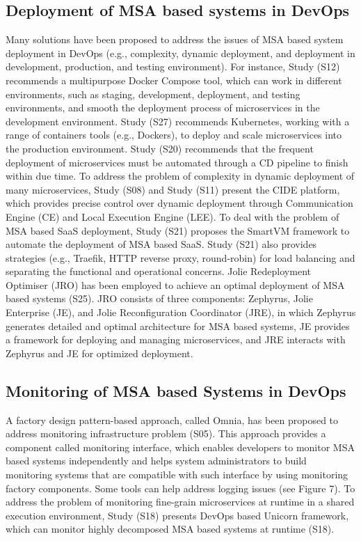 \subsection{Deployment of MSA based systems in DevOps}
Many solutions have been proposed to address the issues of MSA based system deployment in DevOps (e.g., complexity, dynamic deployment, and deployment in development, production, and testing environment). For instance, Study (S12) recommends a multipurpose Docker Compose tool, which can work in different environments, such as staging, development, deployment, and testing environments, and smooth the deployment process of microservices in the development environment. Study (S27) recommends Kubernetes, working with a range of containers tools (e.g., Dockers), to deploy and scale microservices into the production environment. Study (S20) recommends that the frequent deployment of microservices must be automated through a CD pipeline to finish within due time. To address the problem of complexity in dynamic deployment of many microservices, Study (S08) and Study (S11) present the CIDE platform, which provides precise control over dynamic deployment through Communication Engine (CE) and Local Execution Engine (LEE). To deal with the problem of MSA based SaaS deployment, Study (S21) proposes the SmartVM framework to automate the deployment of MSA based SaaS. Study (S21) also provides strategies (e.g., Traefik, HTTP reverse proxy, round-robin) for load balancing and separating the functional and operational concerns. Jolie Redeployment Optimiser (JRO) has been employed to achieve an optimal deployment of MSA based systems (S25). JRO consists of three components: Zephyrus, Jolie Enterprise (JE), and Jolie Reconfiguration Coordinator (JRE), in which Zephyrus generates detailed and optimal architecture for MSA based systems, JE provides a framework for deploying and managing microservices, and JRE interacts with Zephyrus and JE for optimized deployment.

\subsection{Monitoring of MSA based Systems in DevOps}
A factory design pattern-based approach, called Omnia, has been proposed to address monitoring infrastructure problem (S05). This approach provides a component called monitoring interface, which enables developers to monitor MSA based systems independently and helps system administrators to build monitoring systems that are compatible with such interface by using monitoring factory components. Some tools can help address logging issues (see Figure 7). To address the problem of monitoring fine-grain microservices at runtime in a shared execution environment, Study (S18) presents DevOps based Unicorn framework, which can monitor highly decomposed MSA based systems at runtime (S18).

